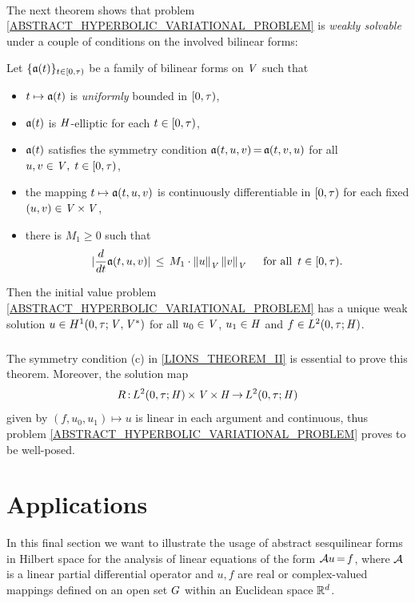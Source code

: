 \documentclass[11pt,twoside]{article}
\begin{document}
\paragraph*{}
The next theorem shows that
problem \ref{ABSTRACT_HYPERBOLIC_VARIATIONAL_PROBLEM}
is \textit{weakly solvable} under a couple of conditions
on the involved bilinear forms:

\begin{theorem}\label{LIONS_THEOREM_II}
Let $\{\mathfrak{a}(t)\}_{t \in [0,\tau)}$ be a family
of bilinear forms on $\mathit{V}$ such that

\begin{itemize}[leftmargin=9mm]
\item[(a)]
$t \mapsto \mathfrak{a}(t)$ is \textit{uniformly} bounded in $[0,\tau)$,

\item[(b)]
$\mathfrak{a}(t)$ is $\mathit{H}$-elliptic for each $t \in [0,\tau)$,

\item[(c)]
$\mathfrak{a}(t)$ satisfies the symmetry condition
$\mathfrak{a}(t,u,v) {\,=\,} \mathfrak{a}(t,v,u)$
for all $u,v \in \mathit{V}, \; t \in [0,\tau)$,

\item[(d)]
the mapping $t \mapsto \mathfrak{a}(t,u,v)$ is continuously differentiable in $[0,\tau)$
for each fixed $(u,v) \in \mathit{V} {\,\times\,} \mathit{V}$,

\item[(e)]
there is $M_1 \geq 0$ such that
\[
\abs{ \frac{d}{dt} \sql(t,u,v)} \, \leq \, 
M_1 \cdot \norm{u}_{\vecV} \norm{v}_{\vecV}
\qfa \, t \in [0,\T).
\]
\end{itemize}
Then the initial value problem \eqref{ABSTRACT_HYPERBOLIC_VARIATIONAL_PROBLEM}
has a unique weak solution $u \in H^1(0,\tau;\mathit{V},\mathit{V}^*)$
for all $u_0 \in \mathit{V}$,
        $u_1 \in \mathit{H}$ and
        $f \in L^2(0,\tau;\mathit{H})$.
\end{theorem}

\subparagraph*{}
The symmetry condition (c) in \ref{LIONS_THEOREM_II} is essential
to prove this theorem.
Moreover,
the solution map
\[
R{\,:\,}L^2(0,\tau;\mathit{H}) {\,\times\,} \mathit{V} {\,\times\,} \mathit{H} {\,\to\,} L^2(0,\tau;\mathit{H})
\]
given by $(f,u_0,u_1) \mapsto u$ is linear in each argument and continuous,
thus problem \eqref{ABSTRACT_HYPERBOLIC_VARIATIONAL_PROBLEM} proves
to be well-posed.

\section{Applications}                                                         %
In this final section we want to illustrate the usage of abstract sesquilinear
forms in Hilbert space for the analysis of linear equations of the form
${\mathcal{A}} u {\,=\,} f$,
where ${\mathcal{A}}$ is a linear partial differential operator and $u,f$ are real
or complex-valued mappings defined on an open set $G$
within an Euclidean space ${\mathbb{R}}^d$.
\end{document}
